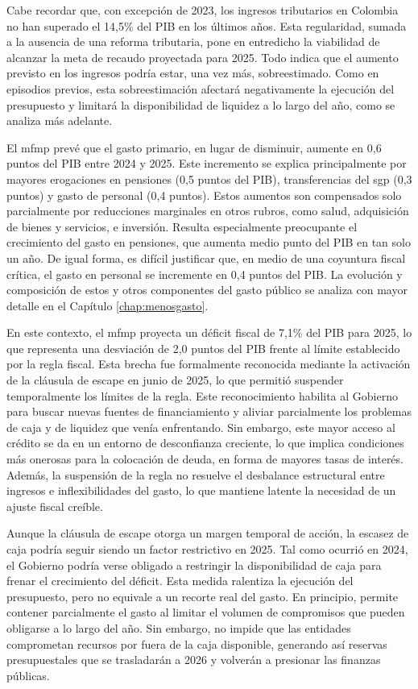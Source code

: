 Cabe recordar que, con excepción de 2023, los ingresos tributarios en Colombia no han superado el 14,5\% del PIB en los últimos años. Esta regularidad, sumada a la ausencia de una reforma tributaria, pone en entredicho la viabilidad de alcanzar la meta de recaudo proyectada para 2025. Todo indica que el aumento previsto en los ingresos podría estar, una vez más, sobreestimado. Como en episodios previos, esta sobreestimación afectará negativamente la ejecución del presupuesto y limitará la disponibilidad de liquidez a lo largo del año, como se analiza más adelante.

El \gls{mfmp} prevé que el gasto primario, en lugar de disminuir, aumente en 0,6 puntos del PIB entre 2024 y 2025. Este incremento se explica principalmente por mayores erogaciones en pensiones (0,5 puntos del PIB), transferencias del \gls{sgp} (0,3 puntos) y gasto de personal (0,4 puntos). Estos aumentos son compensados solo parcialmente por reducciones marginales en otros rubros, como salud, adquisición de bienes y servicios, e inversión. Resulta especialmente preocupante el crecimiento del gasto en pensiones, que aumenta medio punto del PIB en tan solo un año. De igual forma, es difícil justificar que, en medio de una coyuntura fiscal crítica, el gasto en personal se incremente en 0,4 puntos del PIB. La evolución y composición de estos y otros componentes del gasto público se analiza con mayor detalle en el Capítulo \ref{chap:menosgasto}.

En este contexto, el \gls{mfmp} proyecta un déficit fiscal de 7,1\% del PIB para 2025, lo que representa una desviación de 2,0 puntos del PIB frente al límite establecido por la regla fiscal. Esta brecha fue formalmente reconocida mediante la activación de la cláusula de escape en junio de 2025, lo que permitió suspender temporalmente los límites de la regla. Este reconocimiento habilita al Gobierno para buscar nuevas fuentes de financiamiento y aliviar parcialmente los problemas de caja y de liquidez que venía enfrentando. Sin embargo, este mayor acceso al crédito se da en un entorno de desconfianza creciente, lo que implica condiciones más onerosas para la colocación de deuda, en forma de mayores tasas de interés. Además, la suspensión de la regla no resuelve el desbalance estructural entre ingresos e inflexibilidades del gasto, lo que mantiene latente la necesidad de un ajuste fiscal creíble.

Aunque la cláusula de escape otorga un margen temporal de acción, la escasez de caja podría seguir siendo un factor restrictivo en 2025. Tal como ocurrió en 2024, el Gobierno podría verse obligado a restringir la disponibilidad de caja para frenar el crecimiento del déficit. Esta medida ralentiza la ejecución del presupuesto, pero no equivale a un recorte real del gasto. En principio, permite contener parcialmente el gasto al limitar el volumen de compromisos que pueden obligarse a lo largo del año. Sin embargo, no impide que las entidades comprometan recursos por fuera de la caja disponible, generando así reservas presupuestales que se trasladarán a 2026 y volverán a presionar las finanzas públicas.

